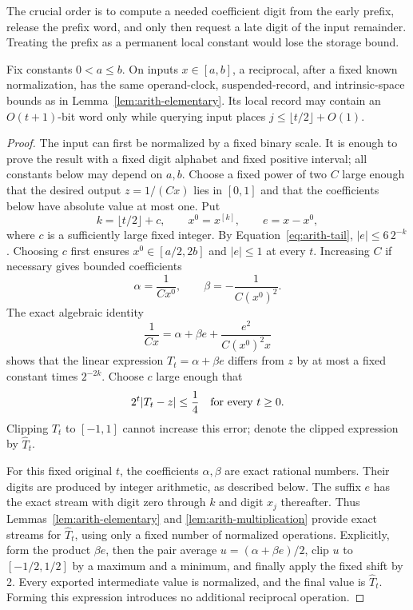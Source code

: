 The crucial order is to compute a needed coefficient digit from the early prefix, release the prefix word, and only then request a late digit of the input remainder. Treating the prefix as a permanent local constant would lose the storage bound.

\begin{lemma}
\label{lem:arith-reciprocal}
Fix constants $0<a\leq b$.  On inputs $x\in[a,b]$, a reciprocal,
after a fixed known normalization, has the same operand-clock,
suspended-record, and intrinsic-space bounds as in
Lemma~\ref{lem:arith-elementary}.  Its local record may contain an
$O(t+1)$-bit word only while querying input places
$j\leq\lfloor t/2\rfloor+O(1)$.
\end{lemma}

\begin{proof}
The input can first be normalized by a fixed binary scale.  It is
enough to prove the result with a fixed digit alphabet and fixed
positive interval; all constants below may depend on $a,b$.
Choose a fixed power of two $C$ large enough that the desired output
$z=1/(Cx)$ lies in $[0,1]$ and that the coefficients below have
absolute value at most one.  Put
\[
 k=\lfloor t/2\rfloor+c,\qquad x^0=x^{[k]},\qquad e=x-x^0,
\]
where $c$ is a sufficiently large fixed integer.  By
Equation~\eqref{eq:arith-tail}, $|e|\leq 6\,2^{-k}$.  Choosing $c$
first ensures $x^0\in[a/2,2b]$ and $|e|\leq1$ at every $t$.
Increasing $C$ if necessary gives bounded coefficients
\[
 \alpha=\frac1{Cx^0},\qquad \beta=-\frac1{C(x^0)^2}.
\]
The exact algebraic identity
\begin{equation}
 \frac1{Cx}=\alpha+\beta e+
               \frac{e^2}{C(x^0)^2x}
 \label{eq:arith-reciprocal-taylor}
\end{equation}
shows that the linear expression $T_t=\alpha+\beta e$ differs
from $z$ by at most a fixed constant times $2^{-2k}$.
Choose $c$ large enough that
\begin{equation}
 2^t|T_t-z|\leq\frac14
 \quad\hbox{for every }t\geq0.
 \label{eq:arith-reciprocal-remainder}
\end{equation}
Clipping $T_t$ to $[-1,1]$ cannot increase this error; denote the
clipped expression by $\widehat T_t$.

For this fixed original $t$, the coefficients $\alpha,\beta$ are
exact rational numbers.  Their digits are produced by integer
arithmetic, as described below.  The suffix $e$ has the exact stream
with digit zero through $k$ and digit $x_j$ thereafter.  Thus
Lemmas~\ref{lem:arith-elementary} and
\ref{lem:arith-multiplication} provide exact streams for
$\widehat T_t$, using only a fixed number of normalized operations.
Explicitly, form the product $\beta e$, then the pair average
$u=(\alpha+\beta e)/2$, clip $u$ to $[-1/2,1/2]$ by a maximum
and a minimum, and finally apply the fixed shift by 2.  Every
exported intermediate value is normalized, and the final value is
$\widehat T_t$.  Forming this expression introduces no additional
reciprocal operation.


\end{proof}
